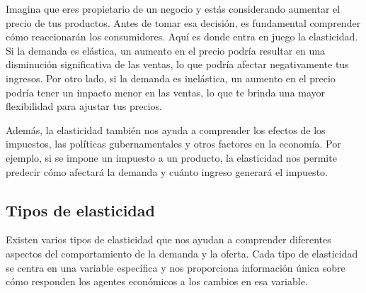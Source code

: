 \documentclass[
  a4paper,
]{article}
\begin{document}
Imagina que eres propietario de un negocio y estás considerando aumentar
el precio de tus productos. Antes de tomar esa decisión, es fundamental
comprender cómo reaccionarán los consumidores. Aquí es donde entra en
juego la elasticidad. Si la demanda es elástica, un aumento en el precio
podría resultar en una disminución significativa de las ventas, lo que
podría afectar negativamente tus ingresos. Por otro lado, si la demanda
es inelástica, un aumento en el precio podría tener un impacto menor en
las ventas, lo que te brinda una mayor flexibilidad para ajustar tus
precios.

Además, la elasticidad también nos ayuda a comprender los efectos de los
impuestos, las políticas gubernamentales y otros factores en la
economía. Por ejemplo, si se impone un impuesto a un producto, la
elasticidad nos permite predecir cómo afectará la demanda y cuánto
ingreso generará el impuesto.

\subsection{Tipos de elasticidad}\label{tipos-de-elasticidad}

Existen varios tipos de elasticidad que nos ayudan a comprender
diferentes aspectos del comportamiento de la demanda y la oferta. Cada
tipo de elasticidad se centra en una variable específica y nos
proporciona información única sobre cómo responden los agentes
económicos a los cambios en esa variable.
\end{document}
